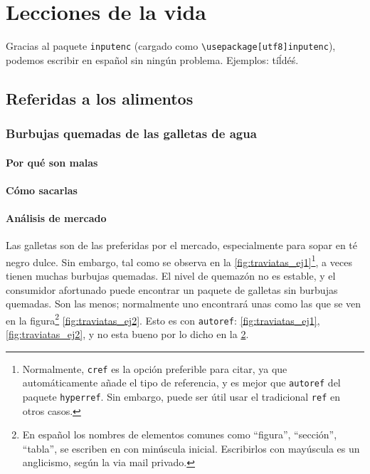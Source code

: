 \chapter{Lecciones de la vida}

Gracias al paquete \texttt{inputenc} (cargado como \texttt{\textbackslash usepackage[utf8]{inputenc}}), podemos escribir en español sin ningún problema. Ejemplos: tíĺdéś. 



\section{Referidas a los alimentos}\label{sec:cap1:alimentos}

\subsection{Burbujas quemadas de las galletas de agua}

\subsubsection{Por qué son malas}

\subsubsection{Cómo sacarlas}

\subsubsection{Análisis de mercado}


Las galletas  son de las preferidas por el mercado, especialmente para sopar en té negro dulce. Sin embargo, tal como se observa en la \cref{fig:traviatas_ej1}\footnote{Normalmente, \texttt{cref} es la opción preferible para citar, ya que automáticamente añade el tipo de referencia, y es mejor que \texttt{autoref} del paquete \texttt{hyperref}. Sin embargo, puede ser útil usar el tradicional \texttt{ref} en otros casos.}, a veces tienen muchas burbujas quemadas. El nivel de quemazón no es estable, y el consumidor afortunado puede encontrar un paquete de galletas sin burbujas quemadas. Son las menos; normalmente uno encontrará unas como las que se ven en la figura\footnote{En español los nombres de elementos comunes como \enquote{figura}, \enquote{sección}, \enquote{tabla}, se escriben en con minúscula inicial. Escribirlos con mayúscula es un anglicismo, según la  via mail privado.\label{notamayusculas}} \ref{fig:traviatas_ej2}. Esto es con \texttt{autoref}: \autoref{fig:traviatas_ej1}, \autoref{fig:traviatas_ej2}, y no esta bueno por lo dicho en la \cref{notamayusculas}.


